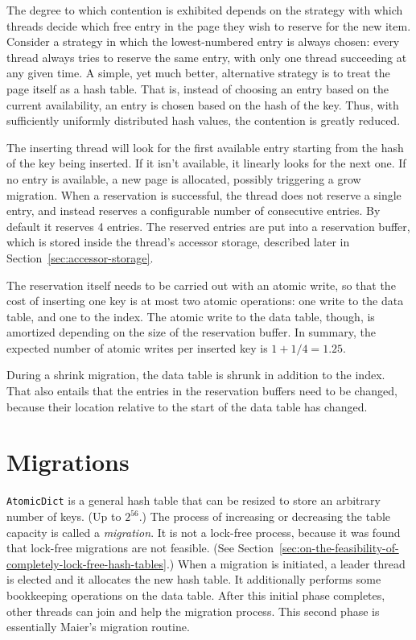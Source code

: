The degree to which contention is exhibited depends on the strategy with which threads decide which free entry in the page they wish to reserve for the new item.
Consider a strategy in which the lowest-numbered entry is always chosen: every thread always tries to reserve the same entry, with only one thread succeeding at any given time.
A simple, yet much better, alternative strategy is to treat the page itself as a hash table.
That is, instead of choosing an entry based on the current availability, an entry is chosen based on the hash of the key.
Thus, with sufficiently uniformly distributed hash values, the contention is greatly reduced.

The inserting thread will look for the first available entry starting from the hash of the key being inserted.
If it isn't available, it linearly looks for the next one.
If no entry is available, a new page is allocated, possibly triggering a grow migration.
When a reservation is successful, the thread does not reserve a single entry, and instead reserves a configurable number of consecutive entries.
By default it reserves 4 entries.
The reserved entries are put into a reservation buffer, which is stored inside the thread's accessor storage, described later in Section~\ref{sec:accessor-storage}.

The reservation itself needs to be carried out with an atomic write, so that the cost of inserting one key is at most two atomic operations: one write to the data table, and one to the index.
The atomic write to the data table, though, is amortized depending on the size of the reservation buffer.
In summary, the expected number of atomic writes per inserted key is $1 + 1/4 = 1.25$.

During a shrink migration, the data table is shrunk in addition to the index.
That also entails that the entries in the reservation buffers need to be changed, because their location relative to the start of the data table has changed.


\section{Migrations}\label{sec:migrations-design}

\texttt{AtomicDict} is a general hash table that can be resized to store an arbitrary number of keys.
(Up to $2^{56}$.)
The process of increasing or decreasing the table capacity is called a \emph{migration}.
It is not a lock-free process, because it was found that lock-free migrations are not feasible.
(See Section~\ref{sec:on-the-feasibility-of-completely-lock-free-hash-tables}.)
When a migration is initiated, a leader thread is elected and it allocates the new hash table.
It additionally performs some bookkeeping operations on the data table.
After this initial phase completes, other threads can join and help the migration process.
This second phase is essentially Maier's migration routine.

